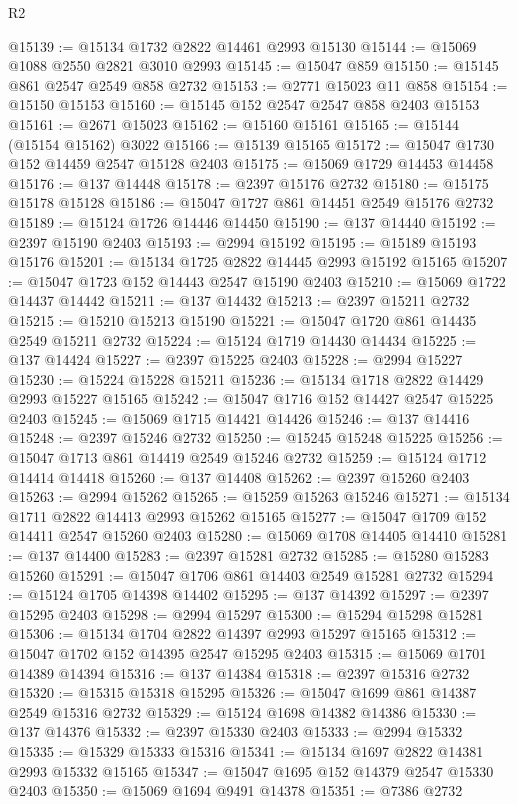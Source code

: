 \begin{lexlean}{R2}
\begin{coremodule}
@15139 := @15134 @1732 @2822 @14461 @2993 @15130
@15144 := @15069 @1088 @2550 @2821 @3010 @2993
@15145 := @15047 @859
@15150 := @15145 @861 @2547 @2549 @858 @2732
@15153 := @2771 @15023 @11 @858
@15154 := @15150 @15153
@15160 := @15145 @152 @2547 @2547 @858 @2403 @15153
@15161 := @2671 @15023
@15162 := @15160 @15161
@15165 := @15144 (@15154 @15162) @3022
@15166 := @15139 @15165
@15172 := @15047 @1730 @152 @14459 @2547 @15128 @2403
@15175 := @15069 @1729 @14453 @14458
@15176 := @137 @14448
@15178 := @2397 @15176 @2732
@15180 := @15175 @15178 @15128
@15186 := @15047 @1727 @861 @14451 @2549 @15176 @2732
@15189 := @15124 @1726 @14446 @14450
@15190 := @137 @14440
@15192 := @2397 @15190 @2403
@15193 := @2994 @15192
@15195 := @15189 @15193 @15176
@15201 := @15134 @1725 @2822 @14445 @2993 @15192 @15165
@15207 := @15047 @1723 @152 @14443 @2547 @15190 @2403
@15210 := @15069 @1722 @14437 @14442
@15211 := @137 @14432
@15213 := @2397 @15211 @2732
@15215 := @15210 @15213 @15190
@15221 := @15047 @1720 @861 @14435 @2549 @15211 @2732
@15224 := @15124 @1719 @14430 @14434
@15225 := @137 @14424
@15227 := @2397 @15225 @2403
@15228 := @2994 @15227
@15230 := @15224 @15228 @15211
@15236 := @15134 @1718 @2822 @14429 @2993 @15227 @15165
@15242 := @15047 @1716 @152 @14427 @2547 @15225 @2403
@15245 := @15069 @1715 @14421 @14426
@15246 := @137 @14416
@15248 := @2397 @15246 @2732
@15250 := @15245 @15248 @15225
@15256 := @15047 @1713 @861 @14419 @2549 @15246 @2732
@15259 := @15124 @1712 @14414 @14418
@15260 := @137 @14408
@15262 := @2397 @15260 @2403
@15263 := @2994 @15262
@15265 := @15259 @15263 @15246
@15271 := @15134 @1711 @2822 @14413 @2993 @15262 @15165
@15277 := @15047 @1709 @152 @14411 @2547 @15260 @2403
@15280 := @15069 @1708 @14405 @14410
@15281 := @137 @14400
@15283 := @2397 @15281 @2732
@15285 := @15280 @15283 @15260
@15291 := @15047 @1706 @861 @14403 @2549 @15281 @2732
@15294 := @15124 @1705 @14398 @14402
@15295 := @137 @14392
@15297 := @2397 @15295 @2403
@15298 := @2994 @15297
@15300 := @15294 @15298 @15281
@15306 := @15134 @1704 @2822 @14397 @2993 @15297 @15165
@15312 := @15047 @1702 @152 @14395 @2547 @15295 @2403
@15315 := @15069 @1701 @14389 @14394
@15316 := @137 @14384
@15318 := @2397 @15316 @2732
@15320 := @15315 @15318 @15295
@15326 := @15047 @1699 @861 @14387 @2549 @15316 @2732
@15329 := @15124 @1698 @14382 @14386
@15330 := @137 @14376
@15332 := @2397 @15330 @2403
@15333 := @2994 @15332
@15335 := @15329 @15333 @15316
@15341 := @15134 @1697 @2822 @14381 @2993 @15332 @15165
@15347 := @15047 @1695 @152 @14379 @2547 @15330 @2403
@15350 := @15069 @1694 @9491 @14378
@15351 := @7386 @2732

\end{coremodule}
\end{lexlean}
